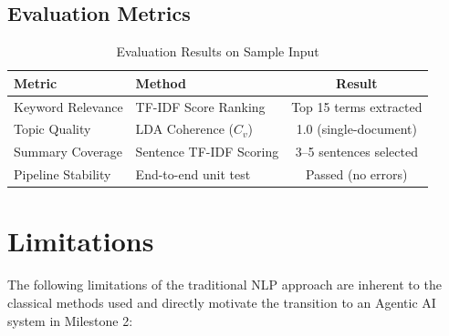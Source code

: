 \documentclass[12pt, a4paper]{article}
\begin{document}
\subsection{Evaluation Metrics}
\begin{table}[H]
\centering
\caption{Evaluation Results on Sample Input}
\begin{tabular}{@{}llc@{}}
\toprule
\textbf{Metric} & \textbf{Method} & \textbf{Result} \\
\midrule
Keyword Relevance    & TF-IDF Score Ranking     & Top 15 terms extracted \\
Topic Quality        & LDA Coherence ($C_v$)    & 1.0 (single-document) \\
Summary Coverage     & Sentence TF-IDF Scoring  & 3--5 sentences selected \\
Pipeline Stability   & End-to-end unit test     & Passed (no errors) \\
\bottomrule
\end{tabular}
\end{table}

\section{Limitations}

The following limitations of the traditional NLP approach are inherent to the classical methods used and directly motivate the transition to an Agentic AI system in Milestone 2:
\end{document}
